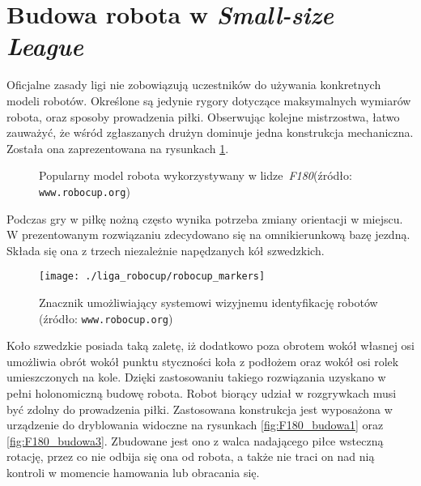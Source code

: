 \section{Budowa robota \label{sec:budowa_robota} w \emph{Small-size League}}
	Oficjalne zasady ligi nie zobowiązują uczestników do używania konkretnych modeli robotów. Określone są jedynie rygory dotyczące maksymalnych wymiarów robota, oraz sposoby prowadzenia piłki.
	Obserwując kolejne mistrzostwa, łatwo zauważyć, że wśród zgłaszanych drużyn dominuje jedna konstrukcja mechaniczna. Została ona zaprezentowana na  rysunkach \ref{fig:F180_budowa}.
 	\begin{figure}
	\centering
	\caption{Popularny model robota wykorzystywany w \mbox{lidze \emph{F180}}\newline(źródło: \texttt{www.robocup.org}) }
	\label{fig:F180_budowa}
	\end{figure}
	Podczas gry w piłkę nożną często wynika potrzeba zmiany orientacji w miejscu. W prezentowanym rozwiązaniu
	zdecydowano się na omnikierunkową bazę jezdną. Składa się ona z trzech niezależnie napędzanych kół szwedzkich.
	\begin{wrapfigure}{r}{0.42\textwidth}
	\vspace{-10pt}
	\begin{center}	
	\texttt{[image: ./liga\_robocup/robocup\_markers]}
	\end{center}
	\caption{Znacznik umożliwiający systemowi wizyjnemu identyfikację robotów \newline(źródło: \texttt{www.robocup.org})\label{fig:znacznik}}
	\vspace{-40pt}
	\end{wrapfigure}
	Koło szwedzkie posiada taką zaletę, iż dodatkowo poza obrotem wokół własnej osi umożliwia obrót
	wokół punktu styczności koła z podłożem oraz wokół osi rolek umieszczonych na kole.
	Dzięki zastosowaniu takiego rozwiązania uzyskano w pełni holonomiczną budowę robota.
	Robot biorący udział w rozgrywkach musi być zdolny do prowadzenia piłki. Zastosowana konstrukcja jest wyposażona w urządzenie do dryblowania widoczne na rysunkach \ref{fig:F180_budowa1} oraz \ref{fig:F180_budowa3}. 
	Zbudowane jest ono z walca nadającego piłce wsteczną rotację, przez co nie odbija się ona od robota, a także nie traci on nad nią kontroli w momencie hamowania lub obracania się.
	
